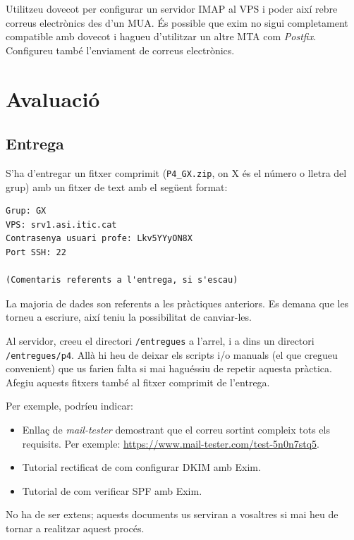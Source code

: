 \documentclass{practicaitic}
\begin{document}
\begin{tasca}
  Utilitzeu dovecot per configurar un servidor IMAP al VPS i poder així rebre
  correus electrònics des d'un MUA. És possible que exim no sigui completament
  compatible amb dovecot i hagueu d'utilitzar un altre MTA com \textit{Postfix}.
  Configureu també l'enviament de correus electrònics.
\end{tasca}

\section{Avaluació}
\subsection{Entrega}
\label{sec:entrega}

S'ha d'entregar un fitxer comprimit (\texttt{P4\_GX.zip}, on X és el número o 
lletra del grup) amb un fitxer de text amb el següent format:

\begin{verbatim}
Grup: GX
VPS: srv1.asi.itic.cat
Contrasenya usuari profe: Lkv5YYyON8X
Port SSH: 22

(Comentaris referents a l'entrega, si s'escau)
\end{verbatim}

La majoria de dades son referents a les pràctiques anteriors. Es demana
que les torneu a escriure, així teniu la possibilitat de canviar-les.

Al servidor, creeu el directori \texttt{/entregues} a l'arrel, i a dins un
directori \texttt{/entregues/p4}. Allà hi heu de deixar els scripts i/o manuals
(el que cregueu convenient) que us farien falta si mai haguéssiu de repetir
aquesta pràctica. Afegiu aquests fitxers també al fitxer comprimit de l'entrega.

Per exemple, podríeu indicar:
\begin{itemize}
  \item Enllaç de \textit{mail-tester} demostrant que el correu sortint compleix tots
  els requisits. Per exemple: \url{https://www.mail-tester.com/test-5n0n7stq5}.
  \item Tutorial rectificat de com configurar DKIM amb Exim.
  \item Tutorial de com verificar SPF amb Exim.
\end{itemize}

No ha de ser extens; aquests documents us serviran a vosaltres si mai heu de
tornar a realitzar aquest procés.
\end{document}
